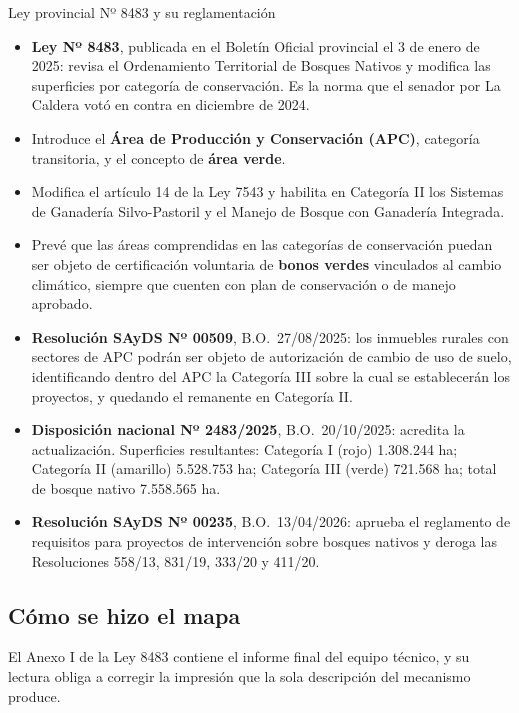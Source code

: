 \begin{ficha}{Ley provincial Nº 8483 y su reglamentación}
\begin{itemize}[leftmargin=*,nosep]
\item \textbf{Ley Nº 8483}, publicada en el Boletín Oficial provincial el 3 de enero de 2025: revisa el Ordenamiento Territorial de Bosques Nativos y modifica las superficies por categoría de conservación. Es la norma que el senador por La Caldera votó en contra en diciembre de 2024.
\item Introduce el \textbf{Área de Producción y Conservación (APC)}, categoría transitoria, y el concepto de \textbf{área verde}.
\item Modifica el artículo 14 de la Ley 7543 y habilita en Categoría II los Sistemas de Ganadería Silvo-Pastoril y el Manejo de Bosque con Ganadería Integrada.
\item Prevé que las áreas comprendidas en las categorías de conservación puedan ser objeto de certificación voluntaria de \textbf{bonos verdes} vinculados al cambio climático, siempre que cuenten con plan de conservación o de manejo aprobado.
\item \textbf{Resolución SAyDS Nº 00509}, B.O.\ 27/08/2025: los inmuebles rurales con sectores de APC podrán ser objeto de autorización de cambio de uso de suelo, identificando dentro del APC la Categoría III sobre la cual se establecerán los proyectos, y quedando el remanente en Categoría II.
\item \textbf{Disposición nacional Nº 2483/2025}, B.O.\ 20/10/2025: acredita la actualización. Superficies resultantes: Categoría I (rojo) 1.308.244 ha; Categoría II (amarillo) 5.528.753 ha; Categoría III (verde) 721.568 ha; total de bosque nativo 7.558.565 ha.
\item \textbf{Resolución SAyDS Nº 00235}, B.O.\ 13/04/2026: aprueba el reglamento de requisitos para proyectos de intervención sobre bosques nativos y deroga las Resoluciones 558/13, 831/19, 333/20 y 411/20.
\end{itemize}
\end{ficha}

\subsection*{Cómo se hizo el mapa}

El Anexo I de la Ley 8483 contiene el informe final del equipo técnico, y su lectura obliga a corregir la impresión que la sola descripción del mecanismo produce.

